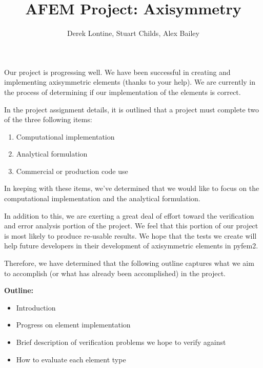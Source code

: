 \documentclass[10pt,letterpaper]{report}
\author{Derek Lontine, Stuart Childs, Alex Bailey}
\title{AFEM Project: Axisymmetry}
\begin{document}
\maketitle
Our project is progressing well. We have been successful in creating and implementing axisymmetric elements (thanks to your help). We are currently in the process of determining if our implementation of the elements is correct. 

In the project assignment details, it is outlined that a project must complete two of the three following items:
\begin{enumerate}
\item Computational implementation
\item Analytical formulation
\item Commercial or production code use
\end{enumerate} 
In keeping with these items, we've determined that we would like to focus on the computational implementation and the analytical formulation. 

In addition to this, we are exerting a great deal of effort toward the verification and error analysis portion of the project. We feel that this portion of our project is most likely to produce re-usable results. We hope that the tests we create will help future developers in their development of axisymmetric elements in pyfem2.

Therefore, we have determined that the following outline captures what we aim to accomplish (or what has already been accomplished) in the project.

\bf{Outline:}\normalfont
\begin{itemize}
\item{Introduction}
\item{Progress on element implementation}
\item{Brief description of verification problems we hope to verify against}
\item{How to evaluate each element type}
\end{itemize}
\end{document}
